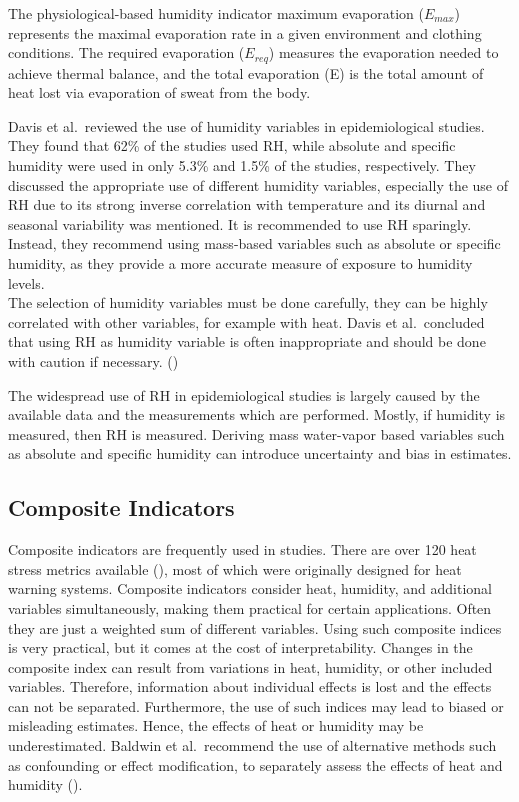 \documentclass[
]{krantz}
\begin{document}
The physiological-based humidity indicator maximum evaporation (\(E_{max}\)) represents the maximal evaporation rate in a given environment and clothing conditions. The required evaporation (\(E_{req}\)) measures the evaporation needed to achieve thermal balance, and the total evaporation (E) is the total amount of heat lost via evaporation of sweat from the body.

Davis et al.~reviewed the use of humidity variables in epidemiological studies. They found that 62\% of the studies used RH, while absolute and specific humidity were used in only 5.3\% and 1.5\% of the studies, respectively. They discussed the appropriate use of different humidity variables, especially the use of RH due to its strong inverse correlation with temperature and its diurnal and seasonal variability was mentioned. It is recommended to use RH sparingly. Instead, they recommend using mass-based variables such as absolute or specific humidity, as they provide a more accurate measure of exposure to humidity levels.\\
The selection of humidity variables must be done carefully, they can be highly correlated with other variables, for example with heat. Davis et al.~concluded that using RH as humidity variable is often inappropriate and should be done with caution if necessary. (\citet{davis})

The widespread use of RH in epidemiological studies is largely caused by the available data and the measurements which are performed. Mostly, if humidity is measured, then RH is measured. Deriving mass water-vapor based variables such as absolute and specific humidity can introduce uncertainty and bias in estimates.

\subsection{Composite Indicators}\label{composite-indicators}

Composite indicators are frequently used in studies. There are over 120 heat stress metrics available (\citet{buzan}), most of which were originally designed for heat warning systems. Composite indicators consider heat, humidity, and additional variables simultaneously, making them practical for certain applications. Often they are just a weighted sum of different variables. Using such composite indices is very practical, but it comes at the cost of interpretability. Changes in the composite index can result from variations in heat, humidity, or other included variables. Therefore, information about individual effects is lost and the effects can not be separated. Furthermore, the use of such indices may lead to biased or misleading estimates. Hence, the effects of heat or humidity may be underestimated. Baldwin et al.~recommend the use of alternative methods such as confounding or effect modification, to separately assess the effects of heat and humidity (\citet{bald}).
\end{document}
